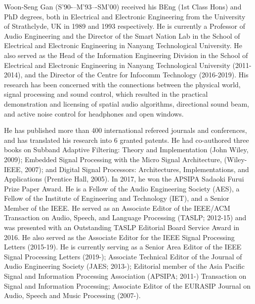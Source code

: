 \documentclass[journal]{IEEEtran}
\begin{document}
\begin{IEEEbiography}{Woon-Seng Gan} (S’90-–M’93–-SM’00)
received his BEng (1st Class Hons) and PhD degrees, both in Electrical and Electronic Engineering from the University of Strathclyde, UK in 1989 and 1993 respectively. He is currently a Professor of Audio Engineering and the Director of the Smart Nation Lab in the School of Electrical and Electronic Engineering in Nanyang Technological University. He also served as the Head of the Information Engineering Division in the School of Electrical and Electronic Engineering in Nanyang Technological University (2011-2014), and the Director of the Centre for Infocomm Technology (2016-2019). His research has been concerned with the connections between the physical world, signal processing and sound control, which resulted in the practical demonstration and licensing of spatial audio algorithms, directional sound beam, and active noise control for headphones and open windows.

He has published more than 400 international refereed journals and conferences, and has translated his research into 6 granted patents. He had co-authored three books on Subband Adaptive Filtering: Theory and Implementation (John Wiley, 2009); Embedded Signal Processing with the Micro Signal Architecture, (Wiley-IEEE, 2007); and Digital Signal Processors: Architectures, Implementations, and Applications (Prentice Hall, 2005). In 2017, he won the APSIPA Sadaoki Furui Prize Paper Award. He is a Fellow of the Audio Engineering Society (AES), a Fellow of the Institute of Engineering and Technology (IET), and a Senior Member of the IEEE. He served as an Associate Editor of the IEEE/ACM Transaction on Audio, Speech, and Language Processing (TASLP; 2012-15) and was presented with an Outstanding TASLP Editorial Board Service Award in 2016. He also served as the Associate Editor for the IEEE Signal Processing Letters (2015-19). He is currently serving as a Senior Area Editor of the IEEE Signal Processing Letters (2019-); Associate Technical Editor of the Journal of Audio Engineering Society (JAES; 2013-); Editorial member of the Asia Pacific Signal and Information Processing Association (APSIPA; 2011-) Transaction on Signal and Information Processing; Associate Editor of the EURASIP Journal on Audio, Speech and Music Processing (2007-).
\end{IEEEbiography}
 
\end{document}
